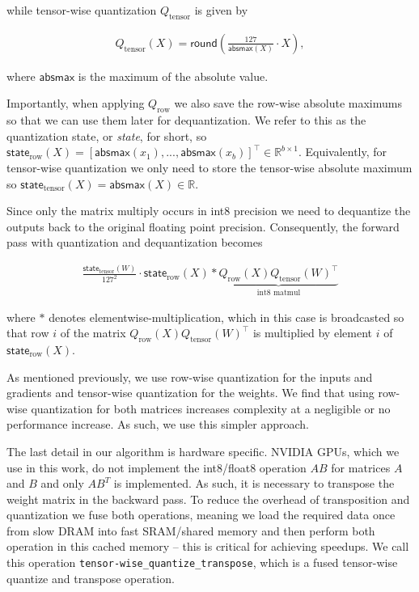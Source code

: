 while tensor-wise quantization $Q_\text{tensor}$ is given by

\begin{align}
Q_{\text{tensor}}\left( X \right)
= 
\mathsf{round}\left(
\frac{127}{\mathsf{absmax}\left(X\right)} \cdot X \right),
\end{align}

where $\mathsf{absmax}$ is the maximum of the absolute value.

Importantly, when applying $Q_\text{row}$ we also save the row-wise absolute maximums so that we can use them later for dequantization. We refer to this as the quantization state, or \emph{state}, for short, so $\mathsf{state}_\text{row}(X) = \left[\mathsf{absmax}(x_1), ... , \mathsf{absmax}(x_b) \right]^\top \in \mathbb{R}^{b \times 1}$. Equivalently, for tensor-wise quantization we only need to store the tensor-wise absolute maximum so $\mathsf{state}_\text{tensor}(X) = \mathsf{absmax}(X) \in \mathbb{R}$.

Since only the matrix multiply occurs in int8 precision we need to dequantize the outputs back to the original floating point precision. Consequently, the forward pass with quantization and dequantization becomes

\begin{align}
    \frac{\mathsf{state}_\text{tensor}(W)}{127^2} \cdot \mathsf{state}_\text{row}(X) * \underbrace{Q_\text{row}\left(X\right) Q_\text{tensor}\left(W\right)^\top}_{\text{int8 matmul}} 
\end{align}

where $*$ denotes elementwise-multiplication, which in this case is broadcasted so that row $i$ of the matrix $Q_\text{row}\left(X\right) Q_\text{tensor}\left(W\right)^\top$ is multiplied by element $i$ of $\mathsf{state}_\text{row}(X)$.

As mentioned previously, we use row-wise quantization for the inputs and gradients and tensor-wise quantization for the weights. We find that using row-wise quantization for both matrices increases complexity at a negligible or no performance increase. As such, we use this simpler approach. 

The last detail in our algorithm is hardware specific. NVIDIA GPUs, which we use in this work, do not implement the int8/float8 operation $AB$ for matrices $A$ and $B$ and only $AB^T$ is implemented. As such, it is necessary to transpose the weight matrix in the backward pass. To reduce the overhead of transposition and quantization we fuse both operations, meaning we load the required data once from slow DRAM into fast SRAM/shared memory and then perform both operation in this cached memory -- this is critical for achieving speedups. We call this operation \texttt{tensor-wise\_quantize\_transpose}, which is a fused tensor-wise quantize and transpose operation.

